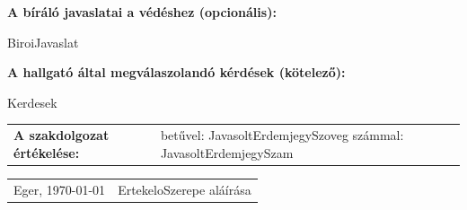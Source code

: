 \documentclass[a4paper,12pt]{article}
\begin{document}
\bigskip


\textbf{A bíráló javaslatai a védéshez (opcionális):}

\vspace{0.3cm}

{{BiroiJavaslat}}

\vspace{1cm}

\textbf{A hallgató által megválaszolandó kérdések (kötelező):}

\vspace{0.3cm}

{{Kerdesek}}

\vspace{1cm}

\begin{tabularx}{\textwidth}{lX}

\textbf{A szakdolgozat értékelése:} &
betűvel: {{JavasoltErdemjegySzoveg}}
\hspace{1cm}
számmal: {{JavasoltErdemjegySzam}}

\end{tabularx}

\vspace{1.5cm}

\begin{tabularx}{\textwidth}{X X}

Eger, \today &
\hfill {{ErtekeloSzerepe}} aláírása

\end{tabularx}
\end{document}
